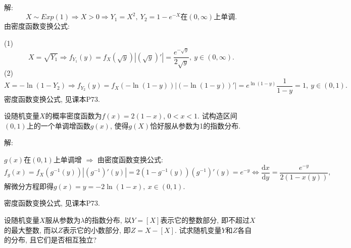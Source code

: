 \documentclass[standard]{ExBook}
\renewenvironment{shaded}{%
  \def\FrameCommand{\fboxsep=\FrameSep \colorbox{shadecolor}}%
  \MakeFramed{\advance\hsize-\width \FrameRestore}%
}{%
  \endMakeFramed
}
\begin{document}
\begin{qitems}
\vspace{\dimexpr2.5cm-5em\relax}

解: 
$$X\sim Exp(1) \Longrightarrow X>0 \Longrightarrow Y_{1}=X^2,\ Y_{2}=1-e^{-X}\text{在}(0,\infty)\text{上单调}.$$
由密度函数变换公式:

(1) $$X=\sqrt{Y_1} \Longrightarrow f_{Y_1}(y)=f_{X}(\sqrt{y})|(\sqrt{y})'|=\displaystyle\frac{e^{-\sqrt{y}}}{2\sqrt{y}},\ y\in(0,\infty).$$
(2) $$X=-\ln(1-Y_2) \Longrightarrow f_{Y_2}(y)=f_{X}(-\ln(1-y))|(-\ln(1-y))'|=e^{\ln(1-y)}\frac{1}{1-y}=1,\ y\in(0,1).$$
\textcolor{themeColor}{\selectfont {} 密度函数变换公式, 见课本P73.}

\vspace{2.5cm-5em}

    \begin{bbox}
    \begin{shaded}
        \qitem
设随机变量$X$的概率密度函数为$f(x)=2(1-x)$, $0<x<1$. 试构造区间$(0, 1)$上的一个单调增函数$g(x)$, 使得$g(X)$恰好服从参数为1的指数分布.
    \end{shaded}
    \end{bbox}

\vspace{\dimexpr2.5cm-5em\relax}

解: 

$g(x)$在$(0,1)$上单调增 $\Longrightarrow$ 由密度函数变换公式:
$$f_{g}(x)=f_{X}\left(g^{-1}(y)\right)\left| \left(g^{-1}\right)'(y) \right|=2\left(1-g^{-1}(y)\right)\left(g^{-1}\right)'(y)=e^{-y} \Longleftrightarrow \frac{\mathrm{d}x}{\mathrm{d}y}=\frac{e^{-y}}{2(1-x(y))},$$
解微分方程即得$g(x)=y=-2\ln(1-x),\ x\in(0,1)$.

\textcolor{themeColor}{\selectfont {} 密度函数变换公式, 见课本P73.}

\vspace{2.5cm-5em}

    \begin{bbox}
    \begin{shaded}
        \qitem
设随机变量$X$服从参数为$\lambda$的指数分布, 以$Y=[X]$表示它的整数部分, 即不超过$X$的最大整数, 而以$Z$表示它的小数部分, 即$Z=X-[X]$. 试求随机变量$Y$和$Z$各自的分布, 且它们是否相互独立?
    \end{shaded}
    \end{bbox}

\vspace{\dimexpr2.5cm-5em\relax}


\end{qitems}
\end{document}
